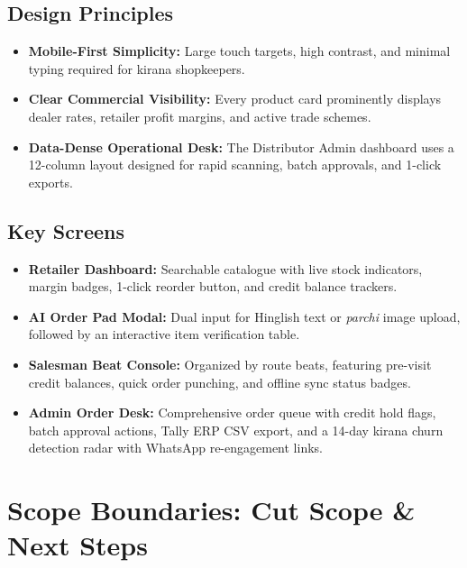 \documentclass[11pt,a4paper]{article}
\begin{document}
\subsection{Design Principles}
\begin{itemize}[leftmargin=1.5cm]
    \item \textbf{Mobile-First Simplicity:} Large touch targets, high contrast, and minimal typing required for kirana shopkeepers.
    \item \textbf{Clear Commercial Visibility:} Every product card prominently displays dealer rates, retailer profit margins, and active trade schemes.
    \item \textbf{Data-Dense Operational Desk:} The Distributor Admin dashboard uses a 12-column layout designed for rapid scanning, batch approvals, and 1-click exports.
\end{itemize}

\subsection{Key Screens}
\begin{itemize}[leftmargin=1.5cm]
    \item \textbf{Retailer Dashboard:} Searchable catalogue with live stock indicators, margin badges, 1-click reorder button, and credit balance trackers.
    \item \textbf{AI Order Pad Modal:} Dual input for Hinglish text or \textit{parchi} image upload, followed by an interactive item verification table.
    \item \textbf{Salesman Beat Console:} Organized by route beats, featuring pre-visit credit balances, quick order punching, and offline sync status badges.
    \item \textbf{Admin Order Desk:} Comprehensive order queue with credit hold flags, batch approval actions, Tally ERP CSV export, and a 14-day kirana churn detection radar with WhatsApp re-engagement links.
\end{itemize}

\section{Scope Boundaries: Cut Scope \& Next Steps}
\end{document}
